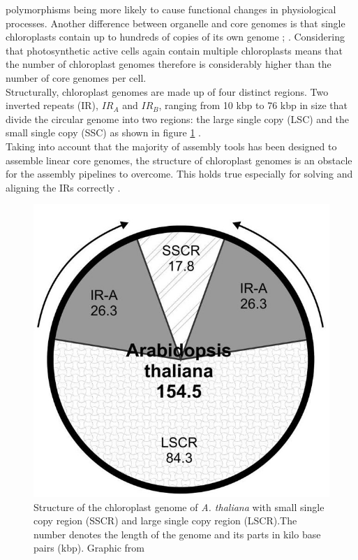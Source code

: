 polymorphisms being more likely to cause functional changes in physiological
processes. Another difference between organelle and core genomes is that single
chloroplasts contain up to hundreds of copies of its own genome \cite{kumar_2014};
\cite{bendich_1987}. Considering that photosynthetic active cells again contain multiple
chloroplasts means that the number of chloroplast genomes therefore is considerably higher than the number of core genomes per cell. \\
Structurally, chloroplast genomes are made up of four distinct regions. Two inverted
repeats (IR), $IR_A$ and $IR_B$, ranging from 10 kbp to 76 kbp in size that divide the
circular genome into two regions: the large
single copy (LSC) and the small single copy (SSC) as shown in figure \ref{fig:cpast_genome} \cite{palmer_1985}.\\
Taking into account that the majority of assembly tools has been designed to assemble
linear core genomes, the structure of chloroplast genomes is an obstacle for the assembly
pipelines to overcome. This holds true especially for solving and aligning the IRs
correctly \cite{Wang2018}.

\begin{figure}[H]
\centering
\includegraphics[height=.55\textheight, width=.95\textwidth]{Figures/cpast}
\decoRule
\caption[Structure of a chloroplast genome]{Structure of the chloroplast genome of
  \textit{A. thaliana} with small single copy region (SSCR) and large single copy region
  (LSCR).The number denotes the length of the genome and its parts in kilo base pairs
  (kbp). Graphic from \cite{olejniczak2016chloroplasts}}
\label{fig:cpast_genome}
\end{figure}

